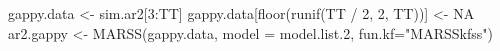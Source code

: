 \begin{Schunk}
\begin{Sinput}
 gappy.data <- sim.ar2[3:TT]
 gappy.data[floor(runif(TT / 2, 2, TT))] <- NA
 ar2.gappy <- MARSS(gappy.data, model = model.list.2, fun.kf="MARSSkfss")
\end{Sinput}
\end{Schunk}
